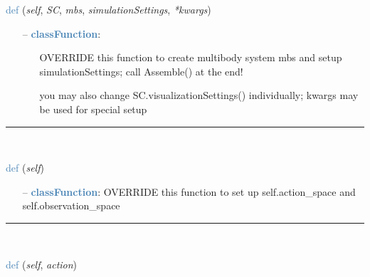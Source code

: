 \begin{itemize}[leftmargin=1.4cm]
\begin{itemize}[leftmargin=1.4cm]
\begin{flushleft}
\noindent \textcolor{steelblue}{def {\bf {}}}\label{sec:artificialIntelligence:OpenAIGymInterfaceEnv(Env):CreateMBS}
({\it self}, {\it SC}, {\it mbs}, {\it simulationSettings}, {\it **kwargs})
\end{flushleft}
\setlength{\itemindent}{0.7cm}
\begin{itemize}[leftmargin=0.7cm]
\item[--]\textcolor{steelblue}{\bf classFunction}: \vspace{-6pt}
\begin{itemize}[leftmargin=1.2cm]
\setlength{\itemindent}{-0.7cm}
\item[]OVERRIDE this function to create multibody system mbs and setup simulationSettings; call Assemble() at the end!
\item[]you may also change SC.visualizationSettings() individually; kwargs may be used for special setup
\end{itemize}
\vspace{12pt}\end{itemize}
%
\noindent\rule{8cm}{0.75pt}\vspace{1pt} \\ 
\begin{flushleft}
\noindent \textcolor{steelblue}{def {\bf {}}}\label{sec:artificialIntelligence:OpenAIGymInterfaceEnv(Env):SetupSpaces}
({\it self})
\end{flushleft}
\setlength{\itemindent}{0.7cm}
\begin{itemize}[leftmargin=0.7cm]
\item[--]\textcolor{steelblue}{\bf classFunction}: OVERRIDE this function to set up self.action\_space and self.observation\_space
\vspace{12pt}\end{itemize}
%
\noindent\rule{8cm}{0.75pt}\vspace{1pt} \\ 
\begin{flushleft}
\noindent \textcolor{steelblue}{def {\bf {}}}\label{sec:artificialIntelligence:OpenAIGymInterfaceEnv(Env):MapAction2MBS}
({\it self}, {\it action})
\end{flushleft}
\setlength{\itemindent}{0.7cm}

\end{itemize}
\end{itemize}
